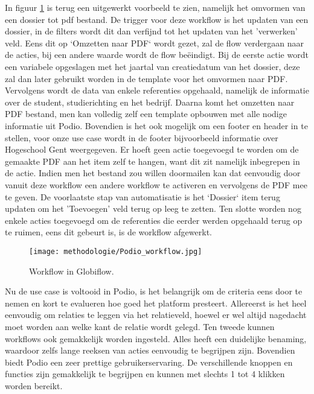 In figuur \ref{fig:meth_podio_workflow} is terug een uitgewerkt voorbeeld te zien, namelijk het omvormen van een dossier tot pdf bestand. De trigger voor deze workflow is het updaten van een dossier, in de filters wordt dit dan verfijnd tot het updaten van het 'verwerken' veld. Eens dit op `Omzetten naar PDF` wordt gezet, zal de flow verdergaan naar de acties, bij een andere waarde wordt de flow beëindigt. Bij de eerste actie wordt een variabele opgeslagen met het jaartal van creatiedatum van het dossier, deze zal dan later gebruikt worden in de template voor het omvormen naar PDF. Vervolgens wordt de data van enkele referenties opgehaald, namelijk de informatie over de student, studierichting en het bedrijf. Daarna komt het omzetten naar PDF bestand, men kan volledig zelf een template opbouwen met alle nodige informatie uit Podio. Bovendien is het ook mogelijk om een footer en header in te stellen, voor onze use case wordt in de footer bijvoorbeeld informatie over Hogeschool Gent weergegeven. Er hoeft geen actie toegevoegd te worden om de gemaakte PDF aan het item zelf te hangen, want dit zit namelijk inbegrepen in de actie. Indien men het bestand zou willen doormailen kan dat eenvoudig door vanuit deze workflow een andere workflow te activeren en vervolgens de PDF mee te geven. De voorlaatste stap van automatisatie is het `Dossier` item terug updaten om het 'Toevoegen' veld terug op leeg te zetten. Ten slotte worden nog enkele acties toegevoegd om de referenties die eerder werden opgehaald terug op te ruimen, eens dit gebeurt is, is de workflow afgewerkt. \\

\begin{figure}[h]
    \centering
    \texttt{[image: methodologie/Podio\_workflow.jpg]}
    \caption{Workflow in Globiflow.}
    \label{fig:meth_podio_workflow}
\end{figure}

Nu de use case is voltooid in Podio, is het belangrijk om de criteria eens door te nemen en kort te evalueren hoe goed het platform presteert. Allereerst is het heel eenvoudig om relaties te leggen via het relatieveld, hoewel er wel altijd nagedacht moet worden aan welke kant de relatie wordt gelegd. Ten tweede kunnen workflows ook gemakkelijk worden ingesteld. Alles heeft een duidelijke benaming, waardoor zelfs lange reeksen van acties eenvoudig te begrijpen zijn. Bovendien biedt Podio een zeer prettige gebruikerservaring. De verschillende knoppen en functies zijn gemakkelijk te begrijpen en kunnen met slechts 1 tot 4 klikken worden bereikt. \\

